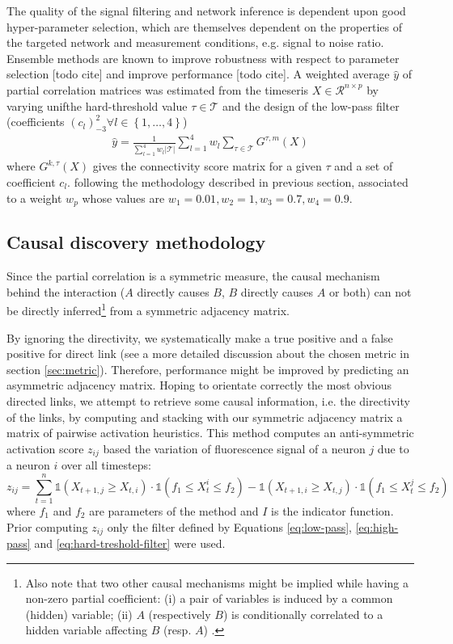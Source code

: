 \documentclass[wcp]{jmlr}
\begin{document}
The quality of the signal filtering and network inference is dependent upon
good hyper-parameter selection, which are themselves dependent on the properties
of the targeted network and measurement conditions, e.g. signal to noise ratio.
Ensemble methods are known to improve robustness with respect to parameter
selection [todo cite] and improve performance [todo cite].
A weighted average $\hat{y}$ of partial correlation matrices was estimated
from the timeseris $X \in \mathcal{R}^{n \times p}$
by varying unifthe hard-threshold value $\tau \in \mathcal{T}$  and the design
of the low-pass filter (coefficients
$(c_l)_{-3}^2 \forall l \in \left\{1,\ldots,4\right\}$)
\begin{align}
\hat{y} = \frac{1}{\sum_{l=1}^4 w_l |\mathcal{T}|} \sum_{l=1}^4  w_l \sum_{\tau \in \mathcal{T}} G^{\tau,m}(X)
\end{align}
where $G^{k, \tau}(X)$ gives the connectivity score matrix for
a given  $\tau$ and a set of coefficient $c_l$. following
the methodology described in previous section, associated to a weight
$w_p$ whose values are $w_1 = 0.01 , w_2 =1, w_3 = 0.7, w_4 = 0.9$.



\subsection{Causal discovery methodology}
Since the partial correlation is a symmetric measure, the causal mechanism behind the
interaction ($A$ directly causes $B$, $B$ directly causes $A$ or both) can not
be directly inferred\footnote{Also note that two other causal mechanisms might be
implied while having a non-zero partial coefficient: (i) a pair of variables
is induced by a common (hidden) variable; (ii) $A$ (respectively $B$) is
conditionally correlated to a hidden variable affecting $B$ (resp. $A$)
\cite{de2004discovery}.} from a symmetric adjacency matrix.

By ignoring the directivity, we systematically make a true positive and a
false positive for direct link (see a more detailed discussion about the
chosen metric in section \ref{sec:metric}). Therefore, performance might be
improved by predicting an asymmetric adjacency matrix. Hoping to orientate
correctly the most obvious directed links, we attempt to retrieve some causal
information, i.e. the directivity of the links, by computing and stacking with
our symmetric adjacency matrix a matrix of pairwise activation heuristics.
This method computes an anti-symmetric activation score $z_{ij}$ based the
variation of fluorescence signal of a neuron $j$ due to a neuron $i$ over all
timesteps:
\[
z_{ij} = \sum_{t=1}^n \mathbb{1}(X_{t+1,j} \ge X_{t, i}) \cdot
\mathbb{1}(f_1\le X_t^i \le f_2) -  \mathbb{1}(X_{t+1,i} \ge X_{t, j}) \cdot
\mathbb{1}(f_1 \le X_t^j \le f_2)
\]
where $f_1$ and $f_2$ are parameters of the method and $I$ is the indicator
function. Prior computing $z_{ij}$ only the filter defined by Equations
\ref{eq:low-pass}, \ref{eq:high-pass} and \ref{eq:hard-treshold-filter} were
used.
\end{document}
